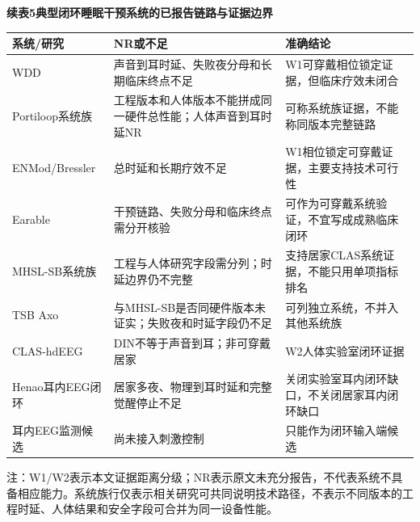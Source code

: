\documentclass[UTF8,zihao=5,fontset=none]{ctexart}
\begin{document}
\begin{center}
\begin{minipage}{\textwidth}
\centering

\fontsize{7.2pt}{8.6pt}\selectfont

\setlength{\tabcolsep}{1.8pt}

\vspace{2pt}

{\bfseries 续表5\quad 典型闭环睡眠干预系统的已报告链路与证据边界}\par

\vspace{2pt}

\begin{tabularx}{\textwidth}{>{\raggedright\arraybackslash}p{}>{\raggedright\arraybackslash}X>{\raggedright\arraybackslash}X}

\hline

系统/研究 & NR或不足 & 准确结论 \\

\hline

WDD & 声音到耳时延、失败夜分母和长期临床终点不足 & W1可穿戴相位锁定证据，但临床疗效未闭合 \\

Portiloop系统族 & 工程版本和人体版本不能拼成同一硬件总性能；人体声音到耳时延NR & 可称系统族证据，不能称同版本完整链路 \\

ENMod/Bressler & 总时延和长期疗效不足 & W1相位锁定可穿戴证据，主要支持技术可行性 \\

Earable & 干预链路、失败分母和临床终点需分开核验 & 可作为可穿戴系统验证，不宜写成成熟临床闭环 \\

MHSL-SB系统族 & 工程与人体研究字段需分列；时延边界仍不完整 & 支持居家CLAS系统证据，不能只用单项指标排名 \\

TSB Axo & 与MHSL-SB是否同硬件版本未证实；失败夜和时延字段仍不足 & 可列独立系统，不并入其他系统族 \\

CLAS-hdEEG & DIN不等于声音到耳；非可穿戴居家 & W2人体实验室闭环证据 \\

Henao耳内EEG闭环 & 居家多夜、物理到耳时延和完整觉醒停止不足 & 关闭实验室耳内闭环缺口，不关闭居家耳内闭环缺口 \\

耳内EEG监测候选 & 尚未接入刺激控制 & 只能作为闭环输入端候选 \\

\hline

\end{tabularx}

\vspace{2pt}
{\raggedright\fontsize{7.2pt}{8.6pt}\selectfont 注：W1/W2表示本文证据距离分级；NR表示原文未充分报告，不代表系统不具备相应能力。系统族行仅表示相关研究可共同说明技术路径，不表示不同版本的工程时延、人体结果和安全字段可合并为同一设备性能。\par}

\end{minipage}
\end{center}
\end{document}
